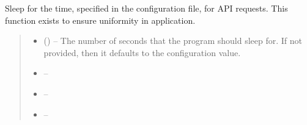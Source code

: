 \documentclass[letterpaper,11pt,english]{sphinxmanual}
\begin{document}
\begin{savenotes}\begin{fulllineitems}
\label{\detokenize{code/opihiexarata.library.http:opihiexarata.library.http.api_request_sleep}}
\pysigstartsignatures
{}
\pysigstopsignatures
\sphinxAtStartPar
Sleep for the time, specified in the configuration file, for API
requests. This function exists to ensure uniformity in application.
\begin{quote}\begin{description}
\begin{itemize}
\item {} 
\sphinxAtStartPar
{} (\sphinxstyleliteralemphasis{\sphinxupquote{, }}) – The number of seconds that the program should sleep for. If not
provided, then it defaults to the configuration value.

\item {} 
\sphinxAtStartPar
{} – 

\item {} 
\sphinxAtStartPar
\sphinxstyleliteralstrong{\sphinxupquote{\sphinxhyphen{}\sphinxhyphen{}\sphinxhyphen{}\sphinxhyphen{}\sphinxhyphen{}\sphinxhyphen{}\sphinxhyphen{}}} – 

\item {} 
\sphinxAtStartPar
{} – 

\end{itemize}

\end{description}\end{quote}

\end{fulllineitems}\end{savenotes}

\end{document}
